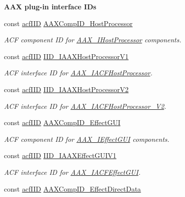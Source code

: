\begin{Indent}{\bf A\+A\+X plug-\/in interface I\+Ds}
\begin{DoxyCompactItemize}
const \hyperlink{a00150_a59df0b41744eee7a066787aaedf97f67}{acf\+I\+I\+D} \hyperlink{a00299_a166521f91afbd59c15651f6cd6c50948}{A\+A\+X\+Comp\+I\+D\+\_\+\+Host\+Processor}
\begin{DoxyCompactList}\small\item\em A\+C\+F component I\+D for \hyperlink{a00101}{A\+A\+X\+\_\+\+I\+Host\+Processor} components. \end{DoxyCompactList}\item 
const \hyperlink{a00150_a59df0b41744eee7a066787aaedf97f67}{acf\+I\+I\+D} \hyperlink{a00299_af605d0ce41316c8195aea193a2b50428}{I\+I\+D\+\_\+\+I\+A\+A\+X\+Host\+Processor\+V1}
\begin{DoxyCompactList}\small\item\em A\+C\+F interface I\+D for \hyperlink{a00066}{A\+A\+X\+\_\+\+I\+A\+C\+F\+Host\+Processor}. \end{DoxyCompactList}\item 
const \hyperlink{a00150_a59df0b41744eee7a066787aaedf97f67}{acf\+I\+I\+D} \hyperlink{a00299_a8b54f0c7603c5f10f588d29307769a48}{I\+I\+D\+\_\+\+I\+A\+A\+X\+Host\+Processor\+V2}
\begin{DoxyCompactList}\small\item\em A\+C\+F interface I\+D for \hyperlink{a00067}{A\+A\+X\+\_\+\+I\+A\+C\+F\+Host\+Processor\+\_\+\+V2}. \end{DoxyCompactList}\item 
const \hyperlink{a00150_a59df0b41744eee7a066787aaedf97f67}{acf\+I\+I\+D} \hyperlink{a00299_aefb6e005966bfdb62469adea5fc55237}{A\+A\+X\+Comp\+I\+D\+\_\+\+Effect\+G\+U\+I}
\begin{DoxyCompactList}\small\item\em A\+C\+F component I\+D for \hyperlink{a00098}{A\+A\+X\+\_\+\+I\+Effect\+G\+U\+I} components. \end{DoxyCompactList}\item 
const \hyperlink{a00150_a59df0b41744eee7a066787aaedf97f67}{acf\+I\+I\+D} \hyperlink{a00299_a525360a79307aa2771a000431e2179f4}{I\+I\+D\+\_\+\+I\+A\+A\+X\+Effect\+G\+U\+I\+V1}
\begin{DoxyCompactList}\small\item\em A\+C\+F interface I\+D for \hyperlink{a00060}{A\+A\+X\+\_\+\+I\+A\+C\+F\+Effect\+G\+U\+I}. \end{DoxyCompactList}\item 
const \hyperlink{a00150_a59df0b41744eee7a066787aaedf97f67}{acf\+I\+I\+D} \hyperlink{a00299_a738ef512d18e611e103c797e2d3cfd3a}{A\+A\+X\+Comp\+I\+D\+\_\+\+Effect\+Direct\+Data}

\end{DoxyCompactItemize}
\end{Indent}
